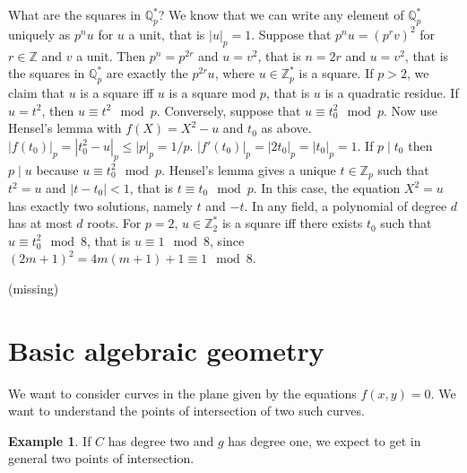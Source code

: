 \documentclass{article}
\newcommand{\Z}{\mathbb{Z}}
\newcommand{\Q}{\mathbb{Q}}
\newcommand{\rb}[1]{\left( #1 \right)}
\newcommand{\abs}[1]{\left\lvert #1 \right\rvert}
\theoremstyle{definition}\newtheorem{definition}{Definition}[section]
\theoremstyle{definition}\newtheorem{remark}[definition]{Remark}
\theoremstyle{definition}\newtheorem*{example}{Example}
\theoremstyle{definition}\newtheorem*{note}{Note}
\begin{document}

What are the squares in $ \Q_p^* $? We know that we can write any element of $ \Q_p^* $ uniquely as $ p^nu $ for $ u $ a unit, that is $ \abs{u}_p = 1 $. Suppose that $ p^nu = \rb{p^rv}^2 $ for $ r \in \Z $ and $ v $ a unit. Then $ p^n = p^{2r} $ and $ u = v^2 $, that is $ n = 2r $ and $ u = v^2 $, that is the squares in $ \Q_p^* $ are exactly the $ p^{2r}u $, where $ u \in \Z_p^* $ is a square. If $ p > 2 $, we claim that $ u $ is a square iff $ u $ is a square mod $ p $, that is $ u $ is a quadratic residue. If $ u = t^2 $, then $ u \equiv t^2 \mod p $. Conversely, suppose that $ u \equiv t_0^2 \mod p $. Now use Hensel's lemma with $ f\rb{X} = X^2 - u $ and $ t_0 $ as above. $ \abs{f\rb{t_0}}_p = \abs{t_0^2 - u}_p \le \abs{p}_p = 1 / p $. $ \abs{f'\rb{t_0}}_p = \abs{2t_0}_p = \abs{t_0}_p = 1 $. If $ p \mid t_0 $ then $ p \mid u $ because $ u \equiv t_0^2 \mod p $. Hensel's lemma gives a unique $ t \in \Z_p $ such that $ t^2 = u $ and $ \abs{t - t_0} < 1 $, that is $ t \equiv t_0 \mod p $. In this case, the equation $ X^2 = u $ has exactly two solutions, namely $ t $ and $ -t $. In any field, a polynomial of degree $ d $ has at most $ d $ roots. For $ p = 2 $, $ u \in \Z_2^* $ is a square iff there exists $ t_0 $ such that $ u \equiv t_0^2 \mod 8 $, that is $ u \equiv 1 \mod 8 $, since $ \rb{2m + 1}^2 = 4m\rb{m + 1} + 1 \equiv 1 \mod 8 $.

(missing)

\section{Basic algebraic geometry}

We want to consider curves in the plane given by the equations $ f\rb{x, y} = 0 $. We want to understand the points of intersection of two such curves.

\begin{example}
If $ C $ has degree two and $ g $ has degree one, we expect to get in general two points of intersection.
\end{example}
\end{document}
